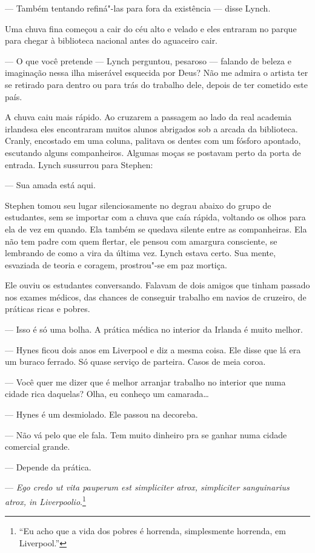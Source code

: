  --- Também tentando refiná"-las para fora da existência --- disse Lynch.

Uma chuva fina começou a cair do céu alto e velado e eles entraram no
parque para chegar à biblioteca nacional antes do aguaceiro cair.

 --- O que você pretende --- Lynch perguntou, pesaroso --- falando de beleza e
imaginação nessa ilha miserável esquecida por Deus? Não me admira o
artista ter se retirado para dentro ou para trás do trabalho dele,
depois de ter cometido este país.

A chuva caiu mais rápido. Ao cruzarem a passagem ao lado da real
academia irlandesa eles encontraram muitos alunos abrigados sob a
arcada da biblioteca. Cranly, encostado em uma coluna, palitava os
dentes com um fósforo apontado, escutando alguns companheiros. Algumas
moças se postavam perto da porta de entrada. Lynch sussurrou para
Stephen:

 --- Sua amada está aqui.

Stephen tomou seu lugar silenciosamente no degrau abaixo do grupo de
estudantes, sem se importar com a chuva que caía rápida, voltando os
olhos para ela de vez em quando. Ela também se quedava silente entre
as companheiras. Ela não tem padre com quem flertar, ele pensou com
amargura consciente, se lembrando de como a vira da última vez. Lynch
estava certo. Sua mente, esvaziada de teoria e coragem, prostrou"-se em
paz mortiça.

Ele ouviu os estudantes conversando. Falavam de dois amigos que tinham
passado nos exames médicos, das chances de conseguir trabalho em navios
de cruzeiro, de práticas ricas e pobres.

 --- Isso é só uma bolha. A prática médica no interior da Irlanda é muito
melhor.

 --- Hynes ficou dois anos em Liverpool e diz a mesma coisa. Ele disse que
lá era um buraco ferrado. Só quase serviço de parteira. Casos de meia
coroa.

 --- Você quer me dizer que é melhor arranjar trabalho no interior que numa
cidade rica daquelas? Olha, eu conheço um camarada\ldots{}

--- Hynes é um desmiolado. Ele passou na decoreba.

 --- Não vá pelo que ele fala. Tem muito dinheiro pra se ganhar numa cidade
comercial grande.

 --- Depende da prática.

 --- \textit{Ego credo ut vita pauperum est simpliciter atrox, simpliciter
sanguinarius atrox, in Liverpoolio}.\footnote{ “Eu acho que a vida dos
pobres é horrenda, simplesmente horrenda, em Liverpool.”}

